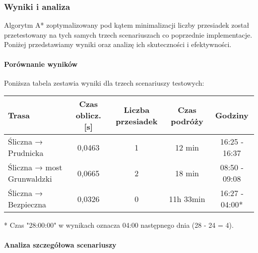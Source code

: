 \documentclass[12pt,a4paper]{article}
\begin{document}
\subsubsection{Wyniki i analiza}
Algorytm A* zoptymalizowany pod kątem minimalizacji liczby przesiadek został przetestowany na tych samych trzech scenariuszach co poprzednie implementacje. Poniżej przedstawiamy wyniki oraz analizę ich skuteczności i efektywności.

\paragraph{Porównanie wyników}
Poniższa tabela zestawia wyniki dla trzech scenariuszy testowych:

\begin{center}
\begin{tabular}{|l|c|c|c|c|}
\hline
\textbf{Trasa} & \textbf{Czas oblicz. [s]} & \textbf{Liczba przesiadek} & \textbf{Czas podróży} & \textbf{Godziny}\\
\hline
Śliczna → Prudnicka & 0,0463 & 1 & 12 min & 16:25 - 16:37 \\
Śliczna → most Grunwaldzki & 0,0665 & 2 & 18 min & 08:50 - 09:08 \\
Śliczna → Bezpieczna & 0,0326 & 0 & 11h 33min & 16:27 - 04:00* \\
\hline
\end{tabular}
\end{center}
\small{* Czas "28:00:00" w wynikach oznacza 04:00 następnego dnia (28 - 24 = 4).}

\paragraph{Analiza szczegółowa scenariuszy}
\end{document}
